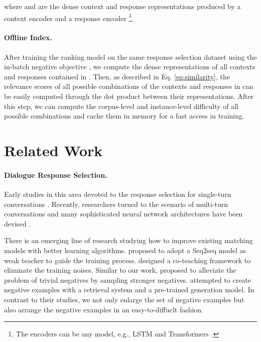 \documentclass[11pt,a4paper]{article}
\begin{document}
where  and  are the dense context and response representations produced by a context encoder  and a response encoder \footnote{The encoders can be any model, e.g., LSTM \cite{DBLP:journals/neco/HochreiterS97} and Transformers \cite{DBLP:conf/nips/VaswaniSPUJGKP17}.}. 

\paragraph{Offline Index.} 
After training the ranking model on the same response selection dataset  using the in-batch negative objective \cite{DBLP:conf/emnlp/KarpukhinOMLWEC20}, we compute the dense representations of all contexts and responses contained in . Then, as described in Eq. \eqref{eq:similarity}, the relevance scores of all possible combinations of the contexts and responses in  can be easily computed through the dot product between their representations. After this step, we can compute the corpus-level and instance-level difficulty of all possible combinations and cache them in memory for a fast access in training.  


\section{Related Work}
\label{sec:related}
\paragraph{Dialogue Response Selection.} Early studies in this area devoted to the response selection for single-turn conversations \cite{DBLP:conf/emnlp/WangLLC13,tan2016lstmbased,DBLP:journals/corr/abs-2004-02214}. Recently, researchers turned to the scenario of multi-turn conversations and many sophisticated neural network architectures have been devised \cite{DBLP:conf/acl/WuWXZL17,DBLP:conf/cikm/GuLL19,DBLP:conf/acl/WuLCZDYZL18,DBLP:conf/cikm/GuLLLSWZ20}. 

There is an emerging line of research studying how to improve existing matching models with better learning algorithms. \citet{DBLP:conf/acl/WuwLZ18} proposed to adopt a Seq2seq model as weak teacher to guide the training process. \citet{DBLP:conf/acl/FengTWFZY19} designed a co-teaching framework to eliminate the training noises. Similar to our work, \citet{li-etal-2019-sampling} proposed to alleviate the problem of trivial negatives by sampling stronger negatives. \citet{lin2020world} attempted to create  negative examples with a retrieval system and a pre-trained generation model. In contrast to their studies, we not only enlarge the set of negative examples but also arrange the negative examples in an easy-to-diffuclt fashion.
\end{document}
